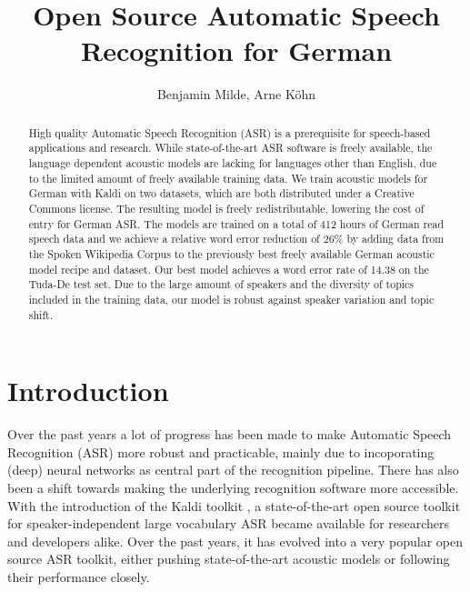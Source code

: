 \documentclass[a4paper]{article}
\title{Open Source Automatic Speech Recognition for German}
\author{Benjamin Milde, Arne Köhn}
\begin{document}
\maketitle

\begin{abstract}

  High quality Automatic Speech Recognition (ASR) is a prerequisite
  for speech-based applications and research. While state-of-the-art
  ASR software is freely available, the language dependent acoustic
  models are lacking for languages other than English, due to the
  limited amount of freely available training data.
We train acoustic models for German with Kaldi on two datasets, which are both
  distributed under a Creative Commons license. The resulting model
  is freely redistributable, lowering the cost of entry for German
  ASR. The models are trained on a total of 412 hours of German read speech data and we achieve a relative word error reduction of 26\% by adding data from the Spoken Wikipedia Corpus to the previously best
  freely available German acoustic model recipe and dataset. Our best model achieves a word error rate of 14.38 on the Tuda-De test set. 
Due to the large amount of speakers and the diversity of topics
  included in the training data, our model is robust against speaker
  variation and topic shift.
  
\end{abstract}


\section{Introduction}
\label{sec:introduction}

Over the past years a lot of progress has been made to make Automatic Speech Recognition (ASR) more robust and practicable, mainly due to incoporating (deep) neural networks as central part of the recognition pipeline. There has also been a shift towards making the underlying recognition software more accessible. With the introduction of the Kaldi toolkit \cite{povey2011kaldi}, a state-of-the-art open source toolkit for speaker-independent large vocabulary ASR became available for researchers and developers alike. Over the past years, it has evolved into a very popular open source ASR toolkit, either pushing state-of-the-art acoustic models or following their performance closely.
\end{document}
